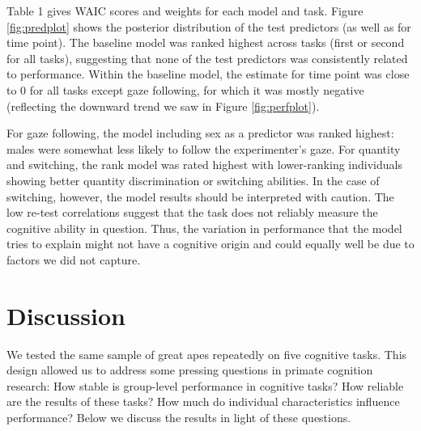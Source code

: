 \documentclass[10pt, letterpaper]{article}
\begin{document}
Table 1 gives WAIC scores and weights for each model and task. Figure
\ref{fig:predplot} shows the posterior distribution of the test
predictors (as well as for time point). The baseline model was ranked
highest across tasks (first or second for all tasks), suggesting that
none of the test predictors was consistently related to performance.
Within the baseline model, the estimate for time point was close to 0
for all tasks except gaze following, for which it was mostly negative
(reflecting the downward trend we saw in Figure \ref{fig:perfplot}).

For gaze following, the model including sex as a predictor was ranked
highest: males were somewhat less likely to follow the experimenter's
gaze. For quantity and switching, the rank model was rated highest with
lower-ranking individuals showing better quantity discrimination or
switching abilities. In the case of switching, however, the model
results should be interpreted with caution. The low re-test correlations
suggest that the task does not reliably measure the cognitive ability in
question. Thus, the variation in performance that the model tries to
explain might not have a cognitive origin and could equally well be due
to factors we did not capture.

\hypertarget{discussion}{%
\section{Discussion}\label{discussion}}

We tested the same sample of great apes repeatedly on five cognitive
tasks. This design allowed us to address some pressing questions in
primate cognition research: How stable is group-level performance in
cognitive tasks? How reliable are the results of these tasks? How much
do individual characteristics influence performance? Below we discuss
the results in light of these questions.
\end{document}
